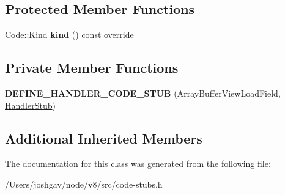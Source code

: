 \subsection*{Protected Member Functions}
\begin{DoxyCompactItemize}
\item 
Code\+::\+Kind {\bfseries kind} () const  override\hypertarget{classv8_1_1internal_1_1_array_buffer_view_load_field_stub_ae13e5f21429f1c83c3de6df9f4cf6380}{}\label{classv8_1_1internal_1_1_array_buffer_view_load_field_stub_ae13e5f21429f1c83c3de6df9f4cf6380}

\end{DoxyCompactItemize}
\subsection*{Private Member Functions}
\begin{DoxyCompactItemize}
\item 
{\bfseries D\+E\+F\+I\+N\+E\+\_\+\+H\+A\+N\+D\+L\+E\+R\+\_\+\+C\+O\+D\+E\+\_\+\+S\+T\+UB} (Array\+Buffer\+View\+Load\+Field, \hyperlink{classv8_1_1internal_1_1_handler_stub}{Handler\+Stub})\hypertarget{classv8_1_1internal_1_1_array_buffer_view_load_field_stub_a46f73152c174c10a2b2be3b335029cf2}{}\label{classv8_1_1internal_1_1_array_buffer_view_load_field_stub_a46f73152c174c10a2b2be3b335029cf2}

\end{DoxyCompactItemize}
\subsection*{Additional Inherited Members}


The documentation for this class was generated from the following file\+:\begin{DoxyCompactItemize}
\item 
/\+Users/joshgav/node/v8/src/code-\/stubs.\+h\end{DoxyCompactItemize}
